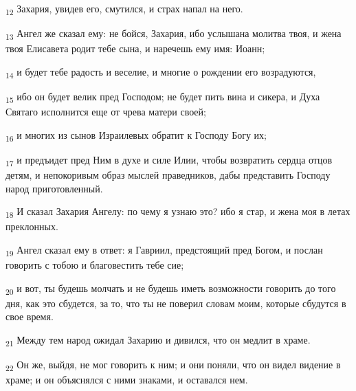 \begin{tcolorbox}
\textsubscript{12} Захария, увидев его, смутился, и страх напал на него.
\end{tcolorbox}
\begin{tcolorbox}
\textsubscript{13} Ангел же сказал ему: не бойся, Захария, ибо услышана молитва твоя, и жена твоя Елисавета родит тебе сына, и наречешь ему имя: Иоанн;
\end{tcolorbox}
\begin{tcolorbox}
\textsubscript{14} и будет тебе радость и веселие, и многие о рождении его возрадуются,
\end{tcolorbox}
\begin{tcolorbox}
\textsubscript{15} ибо он будет велик пред Господом; не будет пить вина и сикера, и Духа Святаго исполнится еще от чрева матери своей;
\end{tcolorbox}
\begin{tcolorbox}
\textsubscript{16} и многих из сынов Израилевых обратит к Господу Богу их;
\end{tcolorbox}
\begin{tcolorbox}
\textsubscript{17} и предъидет пред Ним в духе и силе Илии, чтобы возвратить сердца отцов детям, и непокоривым образ мыслей праведников, дабы представить Господу народ приготовленный.
\end{tcolorbox}
\begin{tcolorbox}
\textsubscript{18} И сказал Захария Ангелу: по чему я узнаю это? ибо я стар, и жена моя в летах преклонных.
\end{tcolorbox}
\begin{tcolorbox}
\textsubscript{19} Ангел сказал ему в ответ: я Гавриил, предстоящий пред Богом, и послан говорить с тобою и благовестить тебе сие;
\end{tcolorbox}
\begin{tcolorbox}
\textsubscript{20} и вот, ты будешь молчать и не будешь иметь возможности говорить до того дня, как это сбудется, за то, что ты не поверил словам моим, которые сбудутся в свое время.
\end{tcolorbox}
\begin{tcolorbox}
\textsubscript{21} Между тем народ ожидал Захарию и дивился, что он медлит в храме.
\end{tcolorbox}
\begin{tcolorbox}
\textsubscript{22} Он же, выйдя, не мог говорить к ним; и они поняли, что он видел видение в храме; и он объяснялся с ними знаками, и оставался нем.
\end{tcolorbox}
